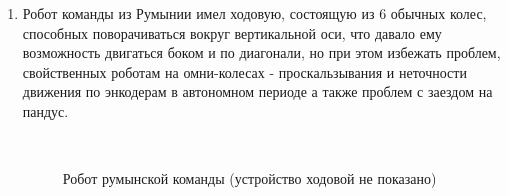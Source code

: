 \begin{enumerate}
\begin{enumerate}
		\item Робот команды из Румынии имел ходовую, состоящую из 6 обычных колес, способных поворачиваться вокруг вертикальной оси, что давало ему возможность двигаться боком и по диагонали, но при этом избежать проблем, свойственных роботам на омни-колесах - проскальзывания и неточности движения по энкодерам в автономном периоде а также проблем с заездом на пандус.
		\begin{figure}[H]
			\begin{minipage}[h]{0.2\linewidth}
				\center  
			\end{minipage}
			\begin{minipage}[h]{0.6\linewidth}
				\caption{Робот румынской команды (устройство ходовой не показано)}
			\end{minipage}
		\end{figure}
		

\end{enumerate}
\end{enumerate}
